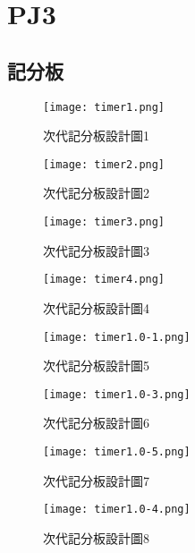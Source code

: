 \chapter{PJ3}


\section{記分板}




	
\begin{figure}
  \centering
  \texttt{[image: timer1.png]}
  \caption{次代記分板設計圖1}
  
\end{figure}

\begin{figure}
  \centering
  \texttt{[image: timer2.png]}
  \caption{次代記分板設計圖2}
  \label{fig:example}
\end{figure}


\begin{figure}
  \centering
  \texttt{[image: timer3.png]}
  \caption{次代記分板設計圖3}
  \label{fig:example}
\end{figure}


\begin{figure}
  \centering
  \texttt{[image: timer4.png]}
  \caption{次代記分板設計圖4}
  \label{fig:example}
\end{figure}


\begin{figure}
  \centering
  \texttt{[image: timer1.0-1.png]}
  \caption{次代記分板設計圖5}
  \label{fig:example}
\end{figure}


\begin{figure}
  \centering
  \texttt{[image: timer1.0-3.png]}
  \caption{次代記分板設計圖6}
  \label{fig:example}
\end{figure}


\begin{figure}
  \centering
  \texttt{[image: timer1.0-5.png]}
  \caption{次代記分板設計圖7}
  \label{fig:example}
\end{figure}


\begin{figure}
  \centering
  \texttt{[image: timer1.0-4.png]}
  \caption{次代記分板設計圖8}
  \label{fig:example}
\end{figure}


